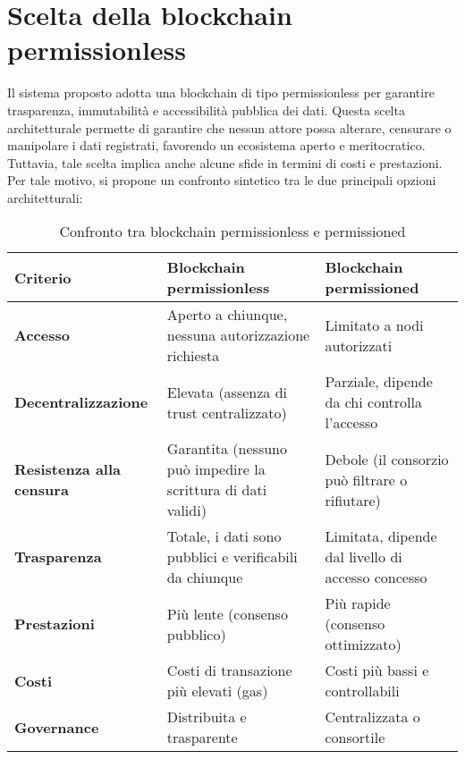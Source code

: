     \section{Scelta della blockchain permissionless}
        Il sistema proposto adotta una blockchain di tipo permissionless per garantire trasparenza, immutabilità e accessibilità pubblica dei dati.
        Questa scelta architetturale permette di garantire che nessun attore possa alterare, censurare o manipolare i dati registrati, favorendo un ecosistema aperto e meritocratico.
        Tuttavia, tale scelta implica anche alcune sfide in termini di costi e prestazioni.
        Per tale motivo, si propone un confronto sintetico tra le due principali opzioni architetturali:
            \begin{table}[H]
                \centering
                \begin{tabular}{|p{3.5cm}|p{4cm}|p{4cm}|}
                    \hline
                    \textbf{Criterio} & \textbf{Blockchain permissionless} & \textbf{Blockchain permissioned} \\
                    \hline
                    \textbf{Accesso} & Aperto a chiunque, nessuna autorizzazione richiesta & Limitato a nodi autorizzati \\
                    \hline
                    \textbf{Decentralizzazione} & Elevata (assenza di trust centralizzato) & Parziale, dipende da chi controlla l'accesso \\
                    \hline
                    \textbf{Resistenza alla censura} & Garantita (nessuno può impedire la scrittura di dati validi) & Debole (il consorzio può filtrare o rifiutare) \\
                    \hline
                    \textbf{Trasparenza} & Totale, i dati sono pubblici e verificabili da chiunque & Limitata, dipende dal livello di accesso concesso \\
                    \hline
                    \textbf{Prestazioni} & Più lente (consenso pubblico) & Più rapide (consenso ottimizzato) \\
                    \hline
                    \textbf{Costi} & Costi di transazione più elevati (gas) & Costi più bassi e controllabili \\
                    \hline
                    \textbf{Governance} & Distribuita e trasparente & Centralizzata o consortile \\
                    \hline
                \end{tabular}
                \caption{Confronto tra blockchain permissionless e permissioned}
                \label{tab:blockchain_comparison}
            \end{table}

